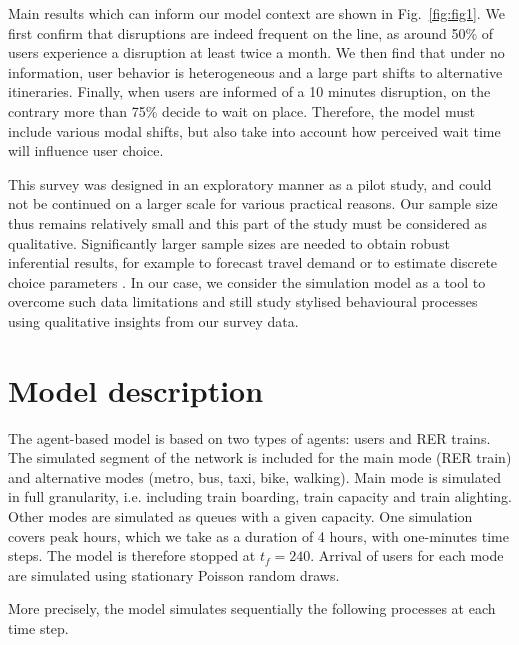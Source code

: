 \documentclass[3p,times,procedia]{elsarticle}
\begin{document}
Main results which can inform our model context are shown in Fig.~\ref{fig:fig1}. We first confirm that disruptions are indeed frequent on the line, as around 50\% of users experience a disruption at least twice a month. We then find that under no information, user behavior is heterogeneous and a large part shifts to alternative itineraries. Finally, when users are informed of a 10 minutes disruption, on the contrary more than 75\% decide to wait on place. Therefore, the model must include various modal shifts, but also take into account how perceived wait time will influence user choice.

This survey was designed in an exploratory manner as a pilot study, and could not be continued on a larger scale for various practical reasons. Our sample size thus remains relatively small and this part of the study must be considered as qualitative. Significantly larger sample sizes are needed to obtain robust inferential results, for example to forecast travel demand \citep{horvath2015estimation} or to estimate discrete choice parameters \citep{bliemer2009efficiency}. In our case, we consider the simulation model as a tool to overcome such data limitations and still study stylised behavioural processes using qualitative insights from our survey data.


\section{Model description}

The agent-based model is based on two types of agents: users and RER trains. The simulated segment of the network is included for the main mode (RER train) and alternative modes (metro, bus, taxi, bike, walking). Main mode is simulated in full granularity, i.e. including train boarding, train capacity and train alighting. Other modes are simulated as queues with a given capacity. One simulation covers peak hours, which we take as a duration of 4 hours, with one-minutes time steps. The model is therefore stopped at $t_f = 240$. Arrival of users for each mode are simulated using stationary Poisson random draws.

More precisely, the model simulates sequentially the following processes at each time step.
\end{document}
